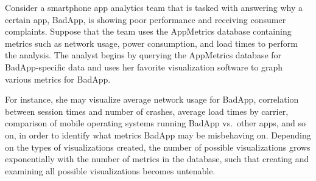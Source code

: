 \begin{example}
Consider a smartphone app analytics team that is tasked with answering why a certain app, 
BadApp, is showing poor performance and receiving consumer complaints. 
Suppose that the team uses the AppMetrics database containing metrics such as network usage, 
power consumption, and load times to perform the analysis.
The analyst begins by querying the AppMetrics database for BadApp-specific data and uses her 
favorite visualization software to graph various metrics for BadApp.

For instance, she may visualize average network usage for BadApp, 
correlation between session times and number of crashes, average load times by carrier, 
comparison of mobile operating systems running BadApp vs.~other apps, and so on,
in order to identify what metrics BadApp may be misbehaving on.
Depending on the types of visualizations created, the number of possible 
visualizations grows exponentially with the number of metrics in the database,
such that creating and examining all possible visualizations
becomes untenable.





\end{example}

